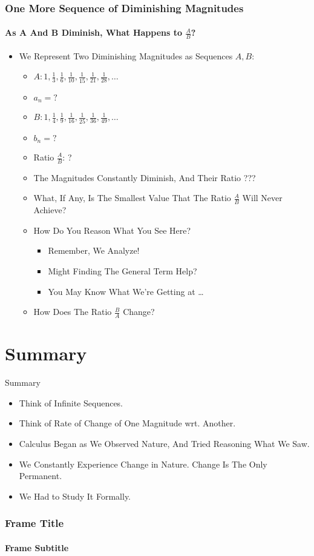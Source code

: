 \documentclass{beamer}
\begin{document}
\begin{frame}
\frametitle{One More Sequence of Diminishing Magnitudes}
\framesubtitle{As A And B Diminish, What Happens to $\frac{A}{B}$?}
\label{slide:dimseq3}
\begin{itemize}
\pause
\item We Represent Two Diminishing Magnitudes as Sequences $A,B$:
\begin{itemize}
\item $A: 1,\frac{1}{3},\frac{1}{6},\frac{1}{10},\frac{1}{15},\frac{1}{21},\frac{1}{28},\dots$
\item $a_n=?$
\item $B: 1,\frac{1}{4},\frac{1}{9},\frac{1}{16},\frac{1}{25},\frac{1}{36},\frac{1}{49},\dots$
\item $b_n=?$
\pause
\item Ratio $\frac{A}{B}$: ?
\pause
\item The Magnitudes Constantly Diminish, And Their Ratio ???
\pause
\item What, If Any, Is The \alert {Smallest Value} That The Ratio $\frac{A}{B}$ Will \alert{Never} Achieve? 
\pause
\item How Do You Reason What You See Here?
\begin{itemize}
\item Remember, We Analyze!
\item Might Finding The \alert{General Term} Help?
\item You May Know What We're Getting at \dots
\end{itemize}
\pause
\item How Does The Ratio $\frac{B}{A}$ Change?
\end{itemize}
\end{itemize}
\end{frame}
\section*{Summary}

\begin{frame}{Summary}
\begin{itemize}
\pause
\item Think of Infinite Sequences.
\pause
\item Think of Rate of Change of One Magnitude wrt. Another.
\pause
\item Calculus Began as We Observed Nature, And Tried Reasoning What We Saw. 
\pause
\item We Constantly Experience Change in Nature. Change Is The Only Permanent. 
\pause
\item We Had to Study It Formally.
\end{itemize}
\end{frame}
\begin{frame}
\frametitle{Frame Title}
\framesubtitle{Frame Subtitle}
\label{slide:slidelabel}
\end{frame}
\end{document}
